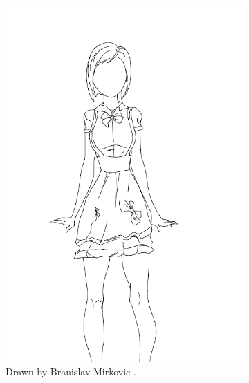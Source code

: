 \begin{figure}
    \centering
    \begin{subfigure}{.45\textwidth}
        \includegraphics[width=\textwidth]{graphics/sketchbench/sketchbench-black_Art_freeform_AG_03_Branislav Mirkovic_norm_cleaned.pdf}
        \caption{Drawn by Branislav Mirkovic \citep{Yan:2020:ABR}.}
    \end{subfigure}
    \begin{subfigure}{.45\textwidth}

\end{subfigure}
\end{figure}
